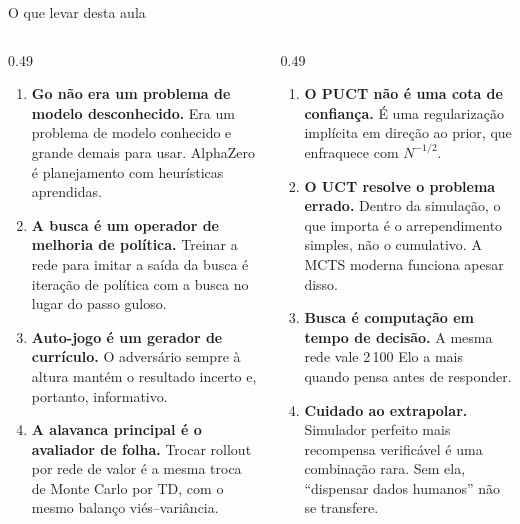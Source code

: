 \documentclass[aspectratio=169, 10pt]{beamer}
\newcommand{\Nvis}{N}
\begin{document}
\begin{frame}{O que levar desta aula}
  \small
  \begin{columns}[T]
    \begin{column}{0.49\textwidth}
      \begin{enumerate}\setlength{\itemsep}{0.35em}
        \item \textbf{Go não era um problema de modelo desconhecido.} Era um
              problema de modelo conhecido e grande demais para usar. AlphaZero é
              planejamento com heurísticas aprendidas.
        \item \textbf{A busca é um operador de melhoria de política.} Treinar a
              rede para imitar a saída da busca é iteração de política com a busca
              no lugar do passo guloso.
        \item \textbf{Auto-jogo é um gerador de currículo.} O adversário sempre à
              altura mantém o resultado incerto e, portanto, informativo.
        \item \textbf{A alavanca principal é o avaliador de folha.} Trocar rollout
              por rede de valor é a mesma troca de Monte Carlo por TD, com o mesmo
              balanço viés--variância.
      \end{enumerate}
    \end{column}
    \begin{column}{0.49\textwidth}
      \begin{enumerate}\setlength{\itemsep}{0.35em}\setcounter{enumi}{4}
        \item \textbf{O PUCT não é uma cota de confiança.} É uma regularização
              implícita em direção ao prior, que enfraquece com $\Nvis^{-1/2}$.
        \item \textbf{O UCT resolve o problema errado.} Dentro da simulação, o que
              importa é o arrependimento simples, não o cumulativo. A MCTS moderna
              funciona apesar disso.
        \item \textbf{Busca é computação em tempo de decisão.} A mesma rede vale
              2\,100 Elo a mais quando pensa antes de responder.
        \item \textbf{Cuidado ao extrapolar.} Simulador perfeito mais recompensa
              verificável é uma combinação rara. Sem ela, ``dispensar dados
              humanos'' não se transfere.
      \end{enumerate}
    \end{column}
  \end{columns}
\end{frame}
\end{document}
